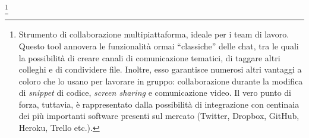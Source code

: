 \footnote{Strumento di collaborazione multipiattaforma, ideale per i team di lavoro. Questo tool annovera le funzionalità ormai “classiche” delle
chat, tra le quali la possibilità di creare canali di comunicazione tematici, di taggare altri colleghi e di condividere file. Inoltre, esso
garantisce numerosi altri vantaggi a coloro che lo usano per lavorare in gruppo: collaborazione durante la modifica di \emph{snippet} di codice,
\emph{screen sharing} e comunicazione video. Il vero punto di forza, tuttavia, è rappresentato dalla possibilità di integrazione con centinaia dei più importanti software presenti sul mercato (Twitter, Dropbox, GitHub, Heroku, Trello etc.).}
